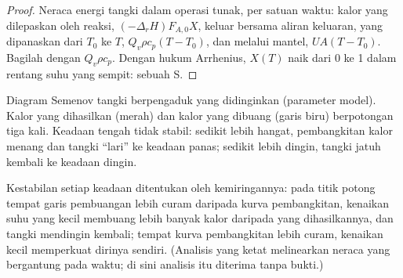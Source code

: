\begin{proof}
Neraca energi tangki dalam operasi tunak, per satuan waktu: kalor yang
dilepaskan oleh reaksi, $(-\Delta_r H)F_{A,0}X$, keluar bersama aliran
keluaran, yang dipanaskan dari $T_0$ ke $T$, $Q_v\rho c_p(T - T_0)$, dan
melalui mantel, $UA(T - T_0)$. Bagilah dengan $Q_v\rho c_p$. Dengan hukum
Arrhenius, $X(T)$ naik dari 0 ke 1 dalam rentang suhu yang sempit: sebuah
S.
\end{proof}

\begin{omfigure}

{\small Diagram Semenov tangki berpengaduk yang didinginkan (parameter
model). Kalor yang dihasilkan (merah) dan kalor yang dibuang (garis biru)
berpotongan tiga kali. Keadaan tengah tidak stabil: sedikit lebih hangat,
pembangkitan kalor menang dan tangki ``lari'' ke keadaan panas; sedikit
lebih dingin, tangki jatuh kembali ke keadaan dingin.}
\end{omfigure}

Kestabilan setiap keadaan ditentukan oleh kemiringannya: pada titik
potong tempat garis pembuangan lebih curam daripada kurva pembangkitan,
kenaikan suhu yang kecil membuang lebih banyak kalor daripada yang
dihasilkannya, dan tangki mendingin kembali; tempat kurva pembangkitan
lebih curam, kenaikan kecil memperkuat dirinya sendiri. (Analisis yang
ketat melinearkan neraca yang bergantung pada waktu; di sini analisis itu
diterima tanpa bukti.)

